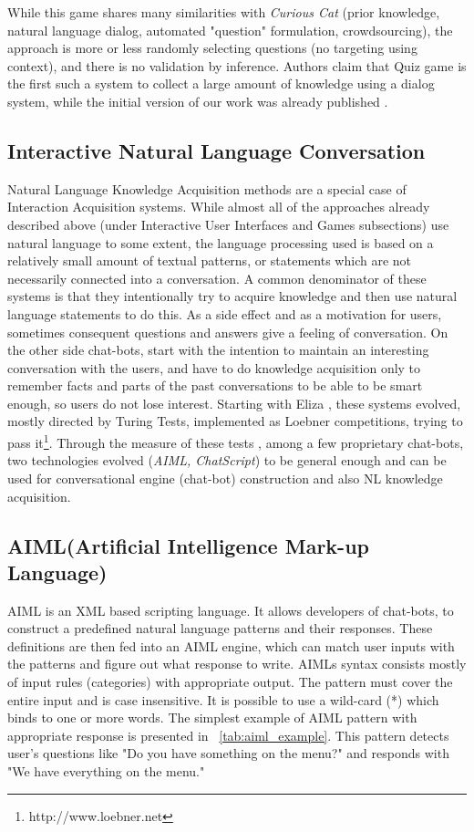 While this game shares many similarities with \emph{Curious Cat} (prior 
knowledge, natural language dialog, automated "question" formulation,
crowdsourcing), the approach is more or less randomly selecting questions
(no targeting using context),
and there is no validation by inference. Authors claim that Quiz game is the first such a system to collect a large amount
of knowledge using a dialog system, while the initial version of our work was already
published \parencite{Bradesko2016}.

\subsection{Interactive Natural Language Conversation}
\label{section:r:inlc}
Natural Language Knowledge Acquisition methods are a special case of Interaction 
Acquisition systems. While almost all of the approaches already described above
(under Interactive User Interfaces and Games subsections) use natural language 
to some extent, the language processing used is based on a relatively small amount
of textual patterns, or statements which are not necessarily connected into a 
conversation. A common denominator of these systems is that they intentionally try
to acquire knowledge and then use natural language statements to do this. As a 
side effect and as a motivation for users, sometimes consequent questions and 
answers give a feeling of conversation. On the other side chat-bots, start with
the intention to maintain an interesting conversation with the users, and have 
to do knowledge acquisition only to remember facts and parts of the past 
conversations to be able to be smart enough, so users do not lose interest.
Starting with Eliza \parencite{Weizenbaum1966}, these systems evolved, mostly 
directed by Turing Tests, implemented as Loebner 
competitions, trying to pass it\footnote{http://www.loebner.net}. Through the 
measure of these tests \parencite{Bradesko2012}, among a few proprietary 
chat-bots, two technologies evolved (\emph{AIML, ChatScript}) to be general 
enough and can be used for conversational engine (chat-bot) construction and 
also NL knowledge acquisition.

\subsection{AIML(Artificial Intelligence Mark-up Language)}
\label{section:r:aiml}
AIML is an XML based 
scripting language. It allows developers of chat-bots, to construct a predefined
natural language patterns and their responses. These definitions are 
then fed into an AIML engine, which can match user inputs with the patterns and 
figure out what response to write. AIMLs syntax consists mostly of input rules 
(categories) with appropriate output. The pattern must cover the entire input 
and is case insensitive. It is possible to use a wild-card (*) which binds to 
one or more words. The simplest example of AIML pattern with appropriate 
response is presented in \tablename~\ref{tab:aiml_example}. This pattern 
detects user's questions like "Do you have something on the menu?" and responds 
with "We have everything on the menu."

